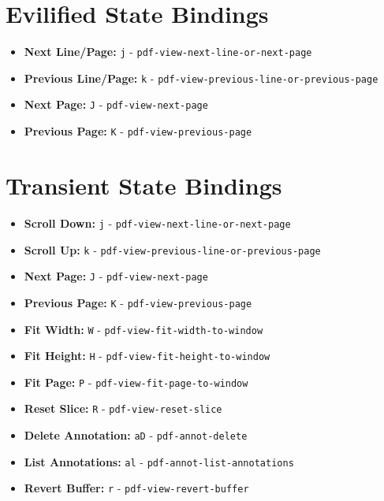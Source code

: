 \documentclass[a4paper,10pt]{article}
\begin{document}
\section*{Evilified State Bindings}
\begin{itemize}
    \item \textbf{Next Line/Page:} \texttt{j} - \texttt{pdf-view-next-line-or-next-page}
    \item \textbf{Previous Line/Page:} \texttt{k} - \texttt{pdf-view-previous-line-or-previous-page}
    \item \textbf{Next Page:} \texttt{J} - \texttt{pdf-view-next-page}
    \item \textbf{Previous Page:} \texttt{K} - \texttt{pdf-view-previous-page}
\end{itemize}

\section*{Transient State Bindings}
\begin{itemize}
    \item \textbf{Scroll Down:} \texttt{j} - \texttt{pdf-view-next-line-or-next-page}
    \item \textbf{Scroll Up:} \texttt{k} - \texttt{pdf-view-previous-line-or-previous-page}
    \item \textbf{Next Page:} \texttt{J} - \texttt{pdf-view-next-page}
    \item \textbf{Previous Page:} \texttt{K} - \texttt{pdf-view-previous-page}
    \item \textbf{Fit Width:} \texttt{W} - \texttt{pdf-view-fit-width-to-window}
    \item \textbf{Fit Height:} \texttt{H} - \texttt{pdf-view-fit-height-to-window}
    \item \textbf{Fit Page:} \texttt{P} - \texttt{pdf-view-fit-page-to-window}
    \item \textbf{Reset Slice:} \texttt{R} - \texttt{pdf-view-reset-slice}
    \item \textbf{Delete Annotation:} \texttt{aD} - \texttt{pdf-annot-delete}
    \item \textbf{List Annotations:} \texttt{al} - \texttt{pdf-annot-list-annotations}
    \item \textbf{Revert Buffer:} \texttt{r} - \texttt{pdf-view-revert-buffer}
\end{itemize}
\end{document}
